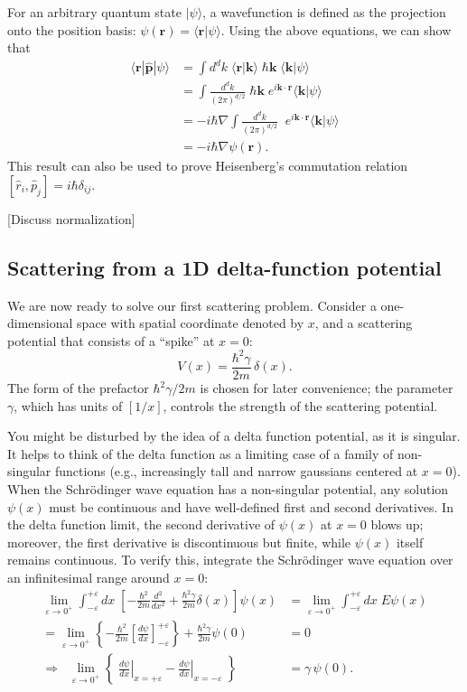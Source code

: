 \documentclass[pra,11pt]{revtex4}
\begin{document}
For an arbitrary quantum state $|\psi\rangle$, a wavefunction is
defined as the projection onto the position basis: $\psi(\mathbf{r}) =
\langle \mathbf{r}|\psi\rangle$.  Using the above equations, we can
show that
$$\begin{aligned}\langle \mathbf{r}|\hat{\mathbf{p}}|\psi\rangle &=  \int d^dk \; \langle\mathbf{r}|\mathbf{k}\rangle \; \hbar\mathbf{k} \; \langle\mathbf{k}|\psi\rangle \\ &=  \int \frac{d^dk}{(2\pi)^{d/2}}\; \hbar\mathbf{k} \;e^{i\mathbf{k}\cdot\mathbf{r}} \langle\mathbf{k}|\psi\rangle \\ &=  -i\hbar\nabla \int \frac{d^dk}{(2\pi)^{d/2}}\; \;e^{i\mathbf{k}\cdot\mathbf{r}} \langle\mathbf{k}|\psi\rangle \\ &= -i\hbar \nabla\psi(\mathbf{r}).\end{aligned}$$
This result can also be used to prove Heisenberg's commutation relation
$[\hat{r}_i, \hat{p}_j] = i\hbar\delta_{ij}$.

[Discuss normalization]

\subsection{Scattering from a 1D delta-function potential}

We are now ready to solve our first scattering problem.  Consider a
one-dimensional space with spatial coordinate denoted by $x$, and a
scattering potential that consists of a ``spike'' at $x = 0$:
$$V(x) = \frac{\hbar^2\gamma}{2m} \,\delta(x).$$
The form of the prefactor $\hbar^2\gamma/2m$ is chosen for later
convenience; the parameter $\gamma$, which has units of $[1/x]$,
controls the strength of the scattering potential.

You might be disturbed by the idea of a delta function potential, as
it is singular.  It helps to think of the delta function as a limiting
case of a family of non-singular functions (e.g., increasingly tall
and narrow gaussians centered at $x=0$).  When the Schr\"odinger wave
equation has a non-singular potential, any solution $\psi(x)$ must be
continuous and have well-defined first and second derivatives.  In the
delta function limit, the second derivative of $\psi(x)$ at $x=0$
blows up; moreover, the first derivative is discontinuous but finite,
while $\psi(x)$ itself remains continuous.  To verify this, integrate
the Schr\"odinger wave equation over an infinitesimal range around $x
= 0$:
$$\begin{aligned}\lim_{\varepsilon\rightarrow 0^+} \int_{-\varepsilon}^{+\varepsilon} dx\; \left[-\frac{\hbar^2}{2m} \frac{d^2}{dx^2} + \frac{\hbar^2\gamma}{2m} \delta(x)\right] \psi(x) &= \lim_{\varepsilon\rightarrow 0^+} \int_{-\varepsilon}^{+\varepsilon} dx\; E \psi(x) \\ = \lim_{\varepsilon\rightarrow 0^+} \left\{-\frac{\hbar^2}{2m} \left[\frac{d\psi}{dx}\right]_{-\varepsilon}^{+\varepsilon} \right\} + \frac{\hbar^2\gamma}{2m} \psi(0) &= 0\\ \Rightarrow \;\; \lim_{\varepsilon\rightarrow 0^+} \left\{\; \left.\frac{d\psi}{dx}\right|_{x = +\varepsilon} - \left.\frac{d\psi}{dx}\right|_{x = -\varepsilon}\; \right\}  &=  \gamma \,\psi(0).\end{aligned}$$
\end{document}
